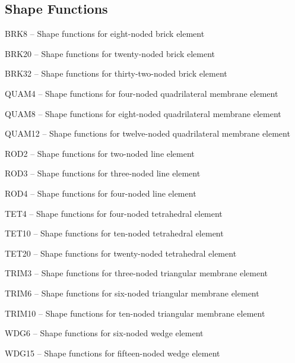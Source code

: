 \subsection*{Shape Functions} %
\begin{list}{}{\leftmargin=57pt }
\item[BRK8 \hfill]   -- Shape functions for eight-noded brick element
\item[BRK20 \hfill]  -- Shape functions for twenty-noded brick element
\item[BRK32 \hfill]  -- Shape functions for thirty-two-noded brick element
\item[QUAM4 \hfill]  -- Shape functions for four-noded quadrilateral membrane element
\item[QUAM8 \hfill]  -- Shape functions for eight-noded quadrilateral membrane element
\item[QUAM12 \hfill] -- Shape functions for twelve-noded quadrilateral membrane element
\item[ROD2 \hfill]   -- Shape functions for two-noded line element
\item[ROD3 \hfill]   -- Shape functions for three-noded line element
\item[ROD4 \hfill]   -- Shape functions for four-noded line element
\item[TET4 \hfill]   -- Shape functions for four-noded tetrahedral element
\item[TET10 \hfill]  -- Shape functions for ten-noded tetrahedral element
\item[TET20 \hfill]  -- Shape functions for twenty-noded tetrahedral element
\item[TRIM3 \hfill]  -- Shape functions for three-noded triangular membrane element
\item[TRIM6 \hfill]  -- Shape functions for six-noded triangular membrane element
\item[TRIM10 \hfill] -- Shape functions for ten-noded triangular membrane element
\item[WDG6 \hfill]   -- Shape functions for six-noded wedge element
\item[WDG15 \hfill]  -- Shape functions for fifteen-noded wedge element
\end{list}
